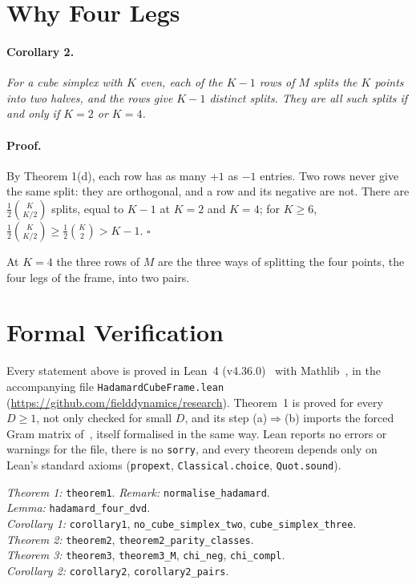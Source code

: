 \documentclass[twocolumn]{iopjournal}
\begin{document}
\section*{Why Four Legs}

\paragraph{Corollary 2.} \textit{For a cube simplex with $K$ even,
each of the $K - 1$ rows of $M$ splits the $K$ points into two
halves, and the rows give $K - 1$ distinct splits. They are all such
splits if and only if $K = 2$ or $K = 4$.}

\paragraph{Proof.} By Theorem 1(d), each row has as many $+1$ as
$-1$ entries. Two rows never give the same split: they are
orthogonal, and a row and its negative are not. There are
$\tfrac12\binom{K}{K/2}$ splits, equal to $K - 1$ at $K = 2$ and
$K = 4$; for $K \ge 6$,
$\tfrac12\binom{K}{K/2} \ge \tfrac12\binom{K}{2} > K - 1$.
\hfill $\square$

\medskip
\noindent
At $K = 4$ the three rows of $M$ are the three ways of splitting
the four points, the four legs of the frame, into two pairs.


\section*{Formal Verification}

Every statement above is proved in Lean~4 (v4.36.0)~\cite{Lean4}
with Mathlib~\cite{Mathlib}, in the accompanying file
\texttt{HadamardCubeFrame.lean}
(\url{https://github.com/fielddynamics/research}). Theorem~1 is
proved for every $D \ge 1$, not only checked for small $D$, and its
step (a)$\Rightarrow$(b) imports the forced Gram matrix
of~\cite{Nelson2026frame}, itself formalised in the same way. Lean
reports no errors or warnings for the file, there is no
\texttt{sorry}, and every theorem depends only on Lean's standard
axioms (\texttt{propext}, \texttt{Classical.choice},
\texttt{Quot.sound}).

{\footnotesize
\begin{flushleft}
\emph{Theorem 1:} \texttt{theorem1}. \emph{Remark:} \texttt{normalise\_hadamard}.\\
\emph{Lemma:} \texttt{hadamard\_four\_dvd}.\\
\emph{Corollary 1:} \texttt{corollary1}, \texttt{no\_cube\_simplex\_two}, \texttt{cube\_simplex\_three}.\\
\emph{Theorem 2:} \texttt{theorem2}, \texttt{theorem2\_parity\_classes}.\\
\emph{Theorem 3:} \texttt{theorem3}, \texttt{theorem3\_M}, \texttt{chi\_neg}, \texttt{chi\_compl}.\\
\emph{Corollary 2:} \texttt{corollary2}, \texttt{corollary2\_pairs}.
\end{flushleft}}
\end{document}
